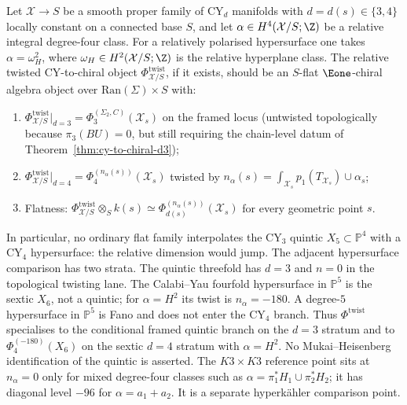 \begin{conjecture}
\label{thm:relative-phi-4-twist}
\ClaimStatusConjectured
Let $\mathcal{X} \to S$ be a smooth proper family of CY${}_d$ manifolds
with $d = d(s) \in \{3, 4\}$ locally constant on a connected base $S$, and
let \(\alpha\in H^4(\mathcal{X}/S;\Z)\) be a relative integral
degree-four class. For a relatively polarised hypersurface one takes
\(\alpha=\omega_H^2\), where \(\omega_H\in H^2(\mathcal X/S;\Z)\) is
the relative hyperplane class. The
relative twisted CY-to-chiral object $\Phi^{\mathrm{twist}}_{\mathcal{X}/S}$,
if it exists, should be an $S$-flat $\Eone$-chiral algebra object over
$\mathrm{Ran}(\Sigma) \times S$ with:
\begin{enumerate}[label=\textup{(}\alph*\textup{)}]
 \item $\Phi^{\mathrm{twist}}_{\mathcal{X}/S}|_{d = 3} =
 \Phi_3^{(\Sigma_2,C)}(\mathcal{X}_s)$ on the framed locus
 \textup{(}untwisted topologically because $\pi_3(BU) = 0$, but still
 requiring the chain-level datum of Theorem~\textup{\ref{thm:cy-to-chiral-d3}}\textup{)};
 \item $\Phi^{\mathrm{twist}}_{\mathcal{X}/S}|_{d = 4}
 = \Phi_4^{(n_\alpha(s))}(\mathcal{X}_s)$ twisted by
 \(n_\alpha(s)=\int_{\mathcal{X}_s}p_1(T_{\mathcal X_s})\cup\alpha_s\);
 \item Flatness: $\Phi^{\mathrm{twist}}_{\mathcal{X}/S} \otimes_S k(s)
	 \simeq \Phi_{d(s)}^{(n_\alpha(s))}(\mathcal{X}_s)$ for every geometric point $s$.
\end{enumerate}
In particular, no ordinary flat family interpolates the CY$_3$ quintic
\(X_5\subset\mathbb P^4\) with a CY$_4$ hypersurface: the relative
dimension would jump. The adjacent hypersurface comparison has two
strata. The quintic threefold has \(d=3\) and \(n=0\) in the
topological twisting lane. The Calabi--Yau fourfold hypersurface in
	\(\mathbb P^5\) is the sextic \(X_6\), not a quintic; for
	\(\alpha=H^2\) its twist is \(n_\alpha=-180\). A degree-\(5\) hypersurface in \(\mathbb P^5\) is Fano and
does not enter the CY$_4$ branch. Thus \(\Phi^{\mathrm{twist}}\)
specialises to the conditional framed quintic branch on the \(d=3\)
	stratum and to \(\Phi_4^{(-180)}(X_6)\) on the sextic \(d=4\) stratum with \(\alpha=H^2\).
No Mukai--Heisenberg identification of the quintic is asserted. The \(K3 \times K3\) reference
point sits at \(n_\alpha=0\) only for mixed degree-four classes such as
\(\alpha=\pi_1^*H_1\cup\pi_2^*H_2\); it has diagonal level \(-96\) for
\(\alpha=a_1+a_2\). It is a separate hyperk\"ahler comparison point.
\end{conjecture}

